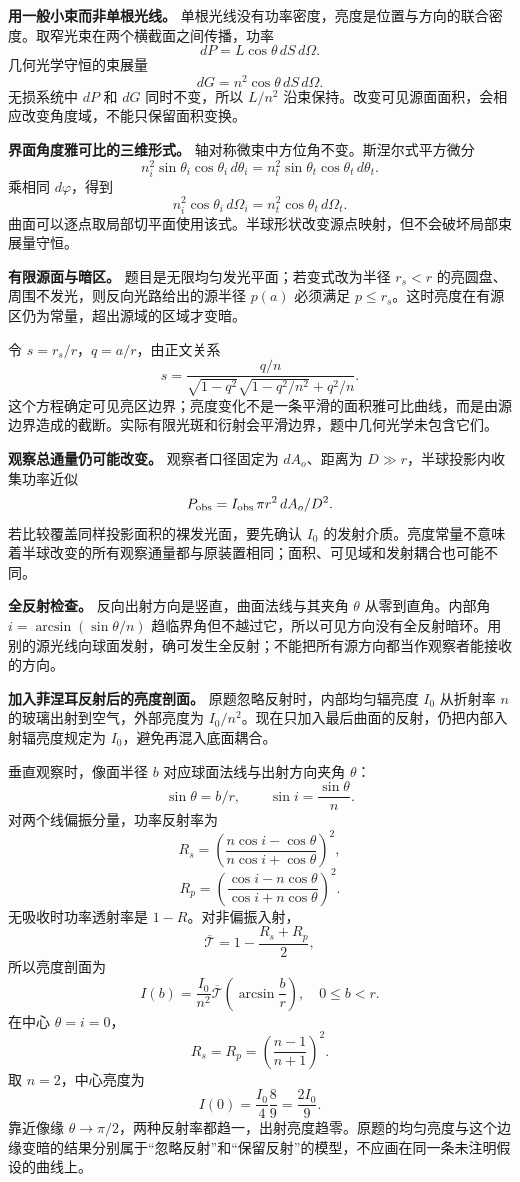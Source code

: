 \documentclass[12pt,a4paper,UTF8]{ctexart}
\begin{document}
\textbf{用一般小束而非单根光线。}
单根光线没有功率密度，亮度是位置与方向的联合密度。取窄光束在两个横截面之间传播，功率
\[
dP=L\cos\theta\,dS\,d\Omega.
\] 几何光学守恒的束展量 \[
dG=n^2\cos\theta\,dS\,d\Omega.
\] 无损系统中 \(dP\) 和 \(dG\) 同时不变，所以 \(L/n^2\)
沿束保持。改变可见源面面积，会相应改变角度域，不能只保留面积变换。

\textbf{界面角度雅可比的三维形式。}
轴对称微束中方位角不变。斯涅尔式平方微分 \[
n_i^2\sin\theta_i\cos\theta_i\,d\theta_i
=n_t^2\sin\theta_t\cos\theta_t\,d\theta_t.
\] 乘相同 \(d\varphi\)，得到 \[
n_i^2\cos\theta_i\,d\Omega_i
=n_t^2\cos\theta_t\,d\Omega_t.
\]
曲面可以逐点取局部切平面使用该式。半球形状改变源点映射，但不会破坏局部束展量守恒。

\textbf{有限源面与暗区。} 题目是无限均匀发光平面；若变式改为半径
\(r_s<r\) 的亮圆盘、周围不发光，则反向光路给出的源半径 \(p(a)\) 必须满足
\(p\le r_s\)。这时亮度在有源区仍为常量，超出源域的区域才变暗。

令 \(s=r_s/r\)，\(q=a/r\)，由正文关系 \[
s=\frac{q/n}{\sqrt{1-q^2}\sqrt{1-q^2/n^2}+q^2/n}.
\]
这个方程确定可见亮区边界；亮度变化不是一条平滑的面积雅可比曲线，而是由源边界造成的截断。实际有限光斑和衍射会平滑边界，题中几何光学未包含它们。

\textbf{观察总通量仍可能改变。} 观察者口径固定为 \(dA_o\)、距离为
\(D\gg r\)，半球投影内收集功率近似 \[
P_{\rm obs}=I_{\rm obs}\,\pi r^2\,dA_o/D^2.
\] 若比较覆盖同样投影面积的裸发光面，要先确认 \(I_0\)
的发射介质。亮度常量不意味着半球改变的所有观察通量都与原装置相同；面积、可见域和发射耦合也可能不同。

\textbf{全反射检查。} 反向出射方向是竖直，曲面法线与其夹角 \(\theta\)
从零到直角。内部角 \(i=\arcsin(\sin\theta/n)\)
趋临界角但不越过它，所以可见方向没有全反射暗环。用别的源光线向球面发射，确可发生全反射；不能把所有源方向都当作观察者能接收的方向。

\textbf{加入菲涅耳反射后的亮度剖面。} 原题忽略反射时，内部均匀辐亮度
\(I_0\) 从折射率 \(n\) 的玻璃出射到空气，外部亮度为
\(I_0/n^2\)。现在只加入最后曲面的反射，仍把内部入射辐亮度规定为
\(I_0\)，避免再混入底面耦合。

垂直观察时，像面半径 \(b\) 对应球面法线与出射方向夹角 \(\theta\)： \[
\sin\theta=b/r,\qquad
\sin i=\frac{\sin\theta}{n}.
\] 对两个线偏振分量，功率反射率为 \[
R_s=\left(\frac{n\cos i-\cos\theta}
{n\cos i+\cos\theta}\right)^2,
\] \[
R_p=\left(\frac{\cos i-n\cos\theta}
{\cos i+n\cos\theta}\right)^2.
\] 无吸收时功率透射率是 \(1-R\)。对非偏振入射， \[
\overline{\mathcal T}=1-\frac{R_s+R_p}{2},
\] 所以亮度剖面为 \[
\boxed{I(b)=\frac{I_0}{n^2}
\overline{\mathcal T}\!\left(\arcsin\frac br\right)},
\quad 0\le b<r.
\] 在中心 \(\theta=i=0\)， \[
R_s=R_p=\left(\frac{n-1}{n+1}\right)^2.
\] 取 \(n=2\)，中心亮度为 \[
I(0)=\frac{I_0}{4}\frac89=\frac{2I_0}{9}.
\] 靠近像缘
\(\theta\to\pi/2\)，两种反射率都趋一，出射亮度趋零。原题的均匀亮度与这个边缘变暗的结果分别属于``忽略反射''和``保留反射''的模型，不应画在同一条未注明假设的曲线上。
\end{document}
